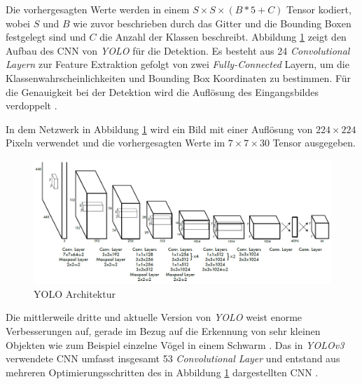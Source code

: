 \newpage

Die vorhergesagten Werte werden in einem $S \times S \times (B * 5 + C)$ Tensor kodiert, wobei $S$ und $B$ wie zuvor beschrieben durch das Gitter und die Bounding Boxen festgelegt sind und $C$ die Anzahl der Klassen beschreibt. Abbildung \ref{yolo_architecture} zeigt den Aufbau des CNN von \textit{YOLO} für die Detektion. Es besteht aus 24 \textit{Convolutional Layern} zur Feature Extraktion gefolgt von zwei \textit{Fully-Connected} Layern, um die Klassenwahrscheinlichkeiten und Bounding Box Koordinaten zu bestimmen. Für die Genauigkeit bei der Detektion wird die Auflösung des Eingangsbildes verdoppelt \cite{JosephRedmon.2016}. 

In dem Netzwerk in Abbildung \ref{yolo_architecture} wird ein Bild mit einer Auflösung von $224 \times 224$ Pixeln verwendet und die vorhergesagten Werte im $7 \times 7 \times 30$ Tensor ausgegeben.

\begin{figure}[ht]
	\begin{center}
		\includegraphics[width=15cm]{Bilder/yolo_architecture.png} 
		\caption[YOLO Architektur]{YOLO Architektur \cite{JosephRedmon.2016}}
		\label{yolo_architecture}
	\end{center}
\end{figure}

Die mittlerweile dritte und aktuelle Version von \textit{YOLO} weist enorme Verbesserungen auf, gerade im Bezug auf die Erkennung von sehr kleinen Objekten wie zum Beispiel einzelne Vögel in einem Schwarm \cite{JosephRedmon.2018}. Das in \textit{YOLOv3} verwendete CNN umfasst insgesamt 53 \textit{Convolutional Layer} und entstand aus mehreren Optimierungsschritten des in Abbildung \ref{yolo_architecture} dargestellten CNN \cite{JosephRedmon.2018}. 





